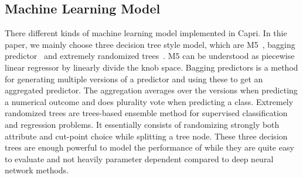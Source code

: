   \subsection{Machine Learning Model}
  \label{sec:matching_learning_model}
  There different kinds of machine learning model implemented in Capri. In
  thie paper, we mainly choose three decision tree style model, which are
  M5~\cite{quinlan1992learning}, bagging predictor~\cite{breiman1996bagging}
  and extremely randomized trees~\cite{geurts2006extremely}. M5 can be
  understood as piecewise linear regressor by linearly divide the knob space.
  Bagging predictors is a method for generating multiple versions of a
  predictor and using these to get an aggregated predictor. The aggregation
  averages over the versions when predicting a numerical outcome and does
  plurality vote when predicting a class. Extremely randomized trees are
  trees-based ensemble method for supervised classification and regression
  problems. It essentially consists of randomizing strongly both attribute
  and cut-point choice while splitting a tree node. These three decision trees
  are enough powerful to model the performance of \gem while they are quite
  easy to evaluate and not heavily parameter dependent compared to
  deep neural network methods.
